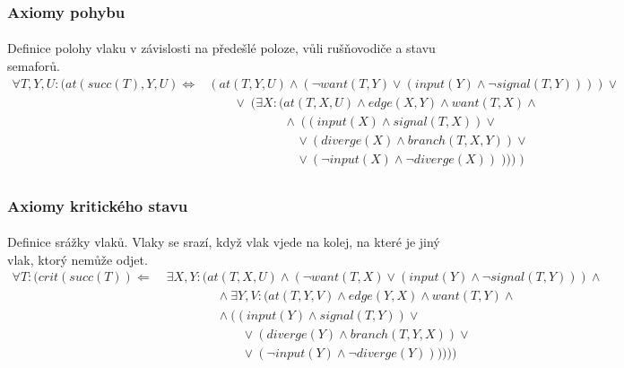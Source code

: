 \documentclass[a4paper,journal]{IEEEtran}
\begin{document}
\subsubsection{Axiomy pohybu}
\paragraph*{}{Definice polohy vlaku v závislosti na předešlé poloze, vůli rušňovodiče a stavu semaforů.}
\begin{equation}
\begin{array}{rl}
\forall T,Y,U: 
	(at\left(succ\left(T\right),Y,U\right) \Leftrightarrow 
		& \left( at\left(T,Y,U\right) \wedge \left( 
			\neg want\left(T,Y\right) \vee 
			\left( 
				input\left(Y\right) \wedge \neg signal\left(T,Y\right)
			\right) 
		\right)
	\right) \vee \\
	& \qquad\vee\;(\exists X: ( 
		at\left(T,X,U\right) \wedge edge\left(X,Y\right) \wedge want\left(T,X\right) \wedge \\ 
		&  \qquad \qquad\qquad \wedge \; (\left(
				input\left(X\right) \wedge signal\left(T,X\right)
			\right) \vee \\
		&  \qquad \qquad\qquad \quad\vee \left(
				diverge\left(X\right) \wedge branch\left(T,X,Y\right)
			\right) \vee \\
		& \qquad \qquad\qquad \quad\vee \left(
				\neg input\left(X\right) \wedge \neg diverge\left(X\right)
			\right) \;))) \;) \\
\end{array}
\end{equation}


\subsubsection{Axiomy kritického stavu}
\paragraph*{}{Definice srážky vlaků. Vlaky se srazí, když vlak vjede na kolej, na které je jiný vlak, ktorý nemůže odjet.}
\begin{equation}
\begin{split}
\forall T:
(
	crit\left(succ\left(T\right)\right) \Leftarrow &\;
	\exists X,Y:(
		at\left(T,X,U\right) \wedge 
		( \neg want\left(T,X\right) \vee 
			( 
				input\left(Y\right) \wedge \neg signal\left(T,Y\right) 
			)
		) \wedge\\
		&\qquad\qquad\;\wedge \exists Y,V: (  at\left(T,Y,V\right) \wedge edge\left(Y,X\right) \wedge want\left(T,Y\right) \wedge \\
		&	\qquad\qquad\;\wedge (
				( input\left(Y\right) \wedge signal\left(T,Y\right)  ) \vee \\
		&		\qquad\qquad\qquad\;\vee ( diverge\left(Y\right) \wedge branch\left(T,Y,X\right) ) \vee \\
		&		\qquad\qquad\qquad\;\vee ( \neg input\left(Y\right) \wedge \neg diverge\left(Y\right)  )
			)
		)
	)
)\\
\end{split}
\end{equation}
\end{document}
